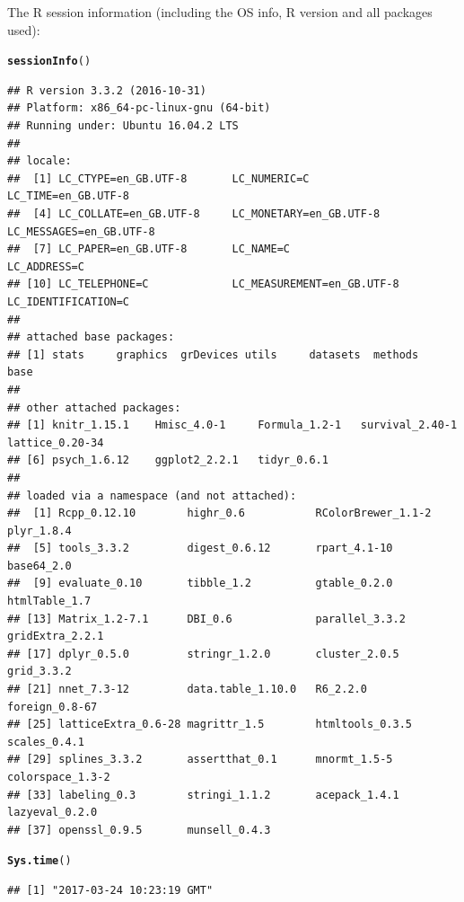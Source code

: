 \documentclass{article}\usepackage[]{graphicx}\usepackage[]{color}
\makeatletter
\newcommand{\hlstd}[1]{\textcolor[rgb]{0.345,0.345,0.345}{#1}}%
\newcommand{\hlkwd}[1]{\textcolor[rgb]{0.737,0.353,0.396}{\textbf{#1}}}%
\newenvironment{kframe}{%
 \def\at@end@of@kframe{}%
 \ifinner\ifhmode%
  \def\at@end@of@kframe{\end{minipage}}%
  \begin{minipage}{\columnwidth}%
 \fi\fi%
 \def\FrameCommand##1{\hskip\@totalleftmargin \hskip-\fboxsep
 \colorbox{shadecolor}{##1}\hskip-\fboxsep
     \hskip-\linewidth \hskip-\@totalleftmargin \hskip\columnwidth}%
 \MakeFramed {\advance\hsize-\width
   \@totalleftmargin\z@ \linewidth\hsize
   \@setminipage}}%
 {\par\unskip\endMakeFramed%
 \at@end@of@kframe}
\newenvironment{knitrout}{}{} %
\makeatother
\begin{document}
The R session information (including the OS info, R version and all
packages used):

\begin{knitrout}
\color{fgcolor}\begin{kframe}
\begin{alltt}
\hlkwd{sessionInfo}\hlstd{()}
\end{alltt}
\begin{verbatim}
## R version 3.3.2 (2016-10-31)
## Platform: x86_64-pc-linux-gnu (64-bit)
## Running under: Ubuntu 16.04.2 LTS
## 
## locale:
##  [1] LC_CTYPE=en_GB.UTF-8       LC_NUMERIC=C               LC_TIME=en_GB.UTF-8       
##  [4] LC_COLLATE=en_GB.UTF-8     LC_MONETARY=en_GB.UTF-8    LC_MESSAGES=en_GB.UTF-8   
##  [7] LC_PAPER=en_GB.UTF-8       LC_NAME=C                  LC_ADDRESS=C              
## [10] LC_TELEPHONE=C             LC_MEASUREMENT=en_GB.UTF-8 LC_IDENTIFICATION=C       
## 
## attached base packages:
## [1] stats     graphics  grDevices utils     datasets  methods   base     
## 
## other attached packages:
## [1] knitr_1.15.1    Hmisc_4.0-1     Formula_1.2-1   survival_2.40-1 lattice_0.20-34
## [6] psych_1.6.12    ggplot2_2.2.1   tidyr_0.6.1    
## 
## loaded via a namespace (and not attached):
##  [1] Rcpp_0.12.10        highr_0.6           RColorBrewer_1.1-2  plyr_1.8.4         
##  [5] tools_3.3.2         digest_0.6.12       rpart_4.1-10        base64_2.0         
##  [9] evaluate_0.10       tibble_1.2          gtable_0.2.0        htmlTable_1.7      
## [13] Matrix_1.2-7.1      DBI_0.6             parallel_3.3.2      gridExtra_2.2.1    
## [17] dplyr_0.5.0         stringr_1.2.0       cluster_2.0.5       grid_3.3.2         
## [21] nnet_7.3-12         data.table_1.10.0   R6_2.2.0            foreign_0.8-67     
## [25] latticeExtra_0.6-28 magrittr_1.5        htmltools_0.3.5     scales_0.4.1       
## [29] splines_3.3.2       assertthat_0.1      mnormt_1.5-5        colorspace_1.3-2   
## [33] labeling_0.3        stringi_1.1.2       acepack_1.4.1       lazyeval_0.2.0     
## [37] openssl_0.9.5       munsell_0.4.3
\end{verbatim}
\begin{alltt}
\hlkwd{Sys.time}\hlstd{()}
\end{alltt}
\begin{verbatim}
## [1] "2017-03-24 10:23:19 GMT"
\end{verbatim}
\end{kframe}
\end{knitrout}
\end{document}
